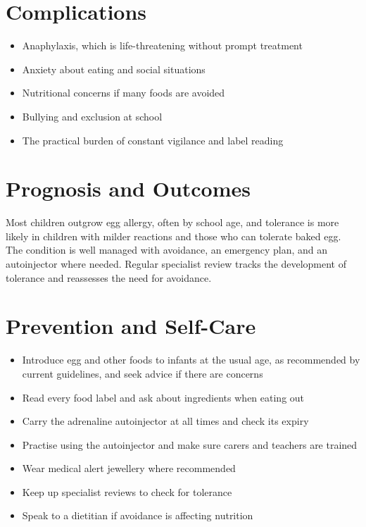 \section*{Complications}
\begin{itemize}
    \item Anaphylaxis, which is life-threatening without prompt treatment
    \item Anxiety about eating and social situations
    \item Nutritional concerns if many foods are avoided
    \item Bullying and exclusion at school
    \item The practical burden of constant vigilance and label reading
\end{itemize}

\section*{Prognosis and Outcomes}
Most children outgrow egg allergy, often by school age, and tolerance is more likely in children with milder reactions and those who can tolerate baked egg. The condition is well managed with avoidance, an emergency plan, and an autoinjector where needed. Regular specialist review tracks the development of tolerance and reassesses the need for avoidance.

\section*{Prevention and Self-Care}
\begin{itemize}
    \item Introduce egg and other foods to infants at the usual age, as recommended by current guidelines, and seek advice if there are concerns
    \item Read every food label and ask about ingredients when eating out
    \item Carry the adrenaline autoinjector at all times and check its expiry
    \item Practise using the autoinjector and make sure carers and teachers are trained
    \item Wear medical alert jewellery where recommended
    \item Keep up specialist reviews to check for tolerance
    \item Speak to a dietitian if avoidance is affecting nutrition
\end{itemize}

